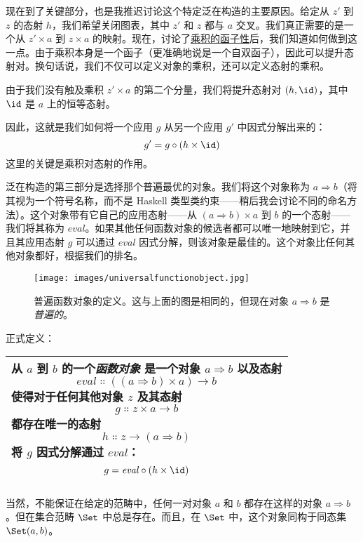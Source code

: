 \noindent
现在到了关键部分，也是我推迟讨论这个特定泛在构造的主要原因。给定从 $z'$ 到 $z$ 的态射 $h$，我们希望关闭图表，其中 $z'$ 和 $z$ 都与 $a$ 交叉。我们真正需要的是一个从 $z' \times a$ 到 $z \times a$ 的映射。现在，讨论了\hyperref[functoriality]{乘积的函子性}后，我们知道如何做到这一点。由于乘积本身是一个函子（更准确地说是一个自双函子），因此可以提升态射对。换句话说，我们不仅可以定义对象的乘积，还可以定义态射的乘积。

由于我们没有触及乘积 $z' \times a$ 的第二个分量，我们将提升态射对 $(h, \id)$，其中 $\id$ 是 $a$ 上的恒等态射。

因此，这就是我们如何将一个应用 $g$ 从另一个应用 $g'$ 中因式分解出来的：
\[g' = g \circ (h \times \id)\]
这里的关键是乘积对态射的作用。

泛在构造的第三部分是选择那个普遍最优的对象。我们将这个对象称为 $a \Rightarrow b$（将其视为一个符号名称，而不是 Haskell 类型类约束——稍后我会讨论不同的命名方法）。这个对象带有它自己的应用态射——从 $(a \Rightarrow b) \times a$ 到 $b$ 的一个态射——我们将其称为 $\mathit{eval}$。如果其他任何函数对象的候选者都可以唯一地映射到它，并且其应用态射 $g$ 可以通过 $\mathit{eval}$ 因式分解，则该对象是最佳的。这个对象比任何其他对象都好，根据我们的排名。

\begin{figure}[H]
  \centering
  \texttt{[image: images/universalfunctionobject.jpg]}
  \caption{普遍函数对象的定义。这与上面的图是相同的，但现在对象 $a \Rightarrow b$ 是\emph{普遍的}。}
\end{figure}

\noindent
正式定义：

\begin{longtable}[]{@{}l@{}}
  \toprule
  \begin{minipage}[t]{0.97\columnwidth}\raggedright\strut
  从 $a$ 到 $b$ 的一个\emph{函数对象} 是一个对象 $a \Rightarrow b$ 以及态射
  \[\mathit{eval} \Colon ((a \Rightarrow b) \times a) \to b\]
  使得对于任何其他对象 $z$ 及其态射
  \[g \Colon z \times a \to b\]
  都存在唯一的态射
  \[h \Colon z \to (a \Rightarrow b)\]
  将 $g$ 因式分解通过 $\mathit{eval}$：
  \[g = \mathit{eval} \circ (h \times \id)\]
  \end{minipage}\tabularnewline
  \bottomrule
\end{longtable}

\noindent
当然，不能保证在给定的范畴中，任何一对对象 $a$ 和 $b$ 都存在这样的对象 $a \Rightarrow b$。但在集合范畴 $\Set$ 中总是存在。而且，在 $\Set$ 中，这个对象同构于同态集 $\Set(a, b)$。

